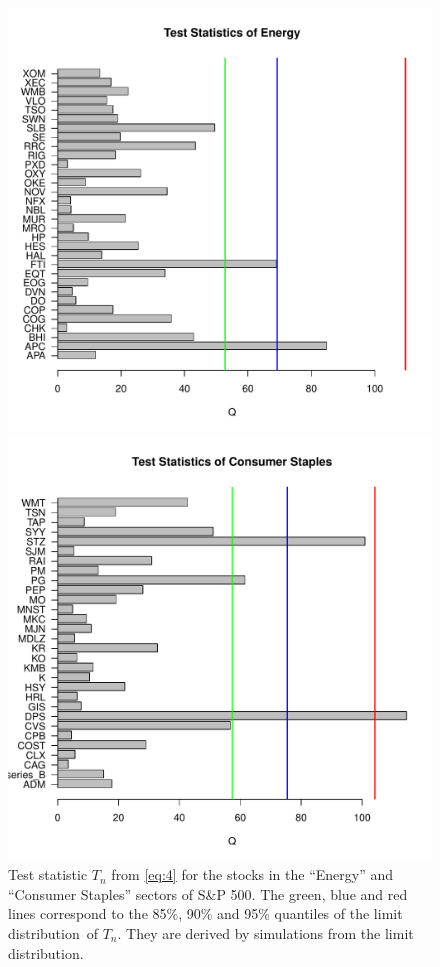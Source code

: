\documentclass[11pt,a4]{amsart}
\newcommand{\ds}{distribution}
\newcommand{\1}{{\mathbf 1}}
\begin{document}
\begin{figure}[htb!]
  \begin{minipage}{0.5\linewidth}
    \includegraphics[width=\textwidth]
    {Hoga_Energy_Single.pdf}
  \end{minipage}\hfill
  \begin{minipage}{0.5\linewidth}
    \includegraphics[width=\textwidth]
    {Hoga_Consumer_Staples_Single.pdf}
  \end{minipage}
  \caption{Test statistic $T_n$ from \eqref{eq:4} for the  stocks in the ``Energy'' and
    ``Consumer Staples'' sectors of S\&P 500. The green, blue and red
    lines correspond to the 85\%, 90\% and 95\% quantiles of the limit \ds\ of $T_n$.  They are derived
by simulations from the limit \ds .}
  \label{fig:Hoga_Single}
\end{figure}
\end{document}
